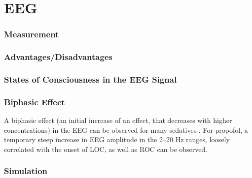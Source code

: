 \section{EEG}\label{sec:eeg}
\subsubsection{Measurement}\label{subsec:measurement}
\qquad {}




\subsubsection{Advantages/Disadvantages}\label{subsec:advantages/disadvantages}
\qquad {}
\subsubsection{States of Consciousness in the EEG Signal}\label{subsec:states-of-consciousness-in-the-eeg-signal}
\qquad {}




\subsubsection{Biphasic Effect}

A biphasic effect (an initial increase of an effect, that decreases with higher concentrations) in the EEG can be
observed for many sedatives \cite{kuizenga_quantitative_1998, kuizenga_biphasic_2001}.
For propofol, a temporary steep increase in EEG amplitude in the 2--20 Hz ranges, loosely correlated with the onset of
LOC, as well as ROC can be observed.




\subsubsection{Simulation}\label{subsec:simulation}

 \qquad \qquad {}
 \qquad \qquad {}
 \qquad \qquad {}
 
